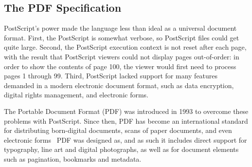 % 
% 

\subsection{The PDF Specification}

PostScript's power made the language less than ideal as a universal
document format. First, the PostScript is somewhat verbose, so
PostScript files could get quite large. Second, the PostScript
execution context is not reset after each page, with the result that
PostScript viewers could not display pages out-of-order: in order to
show the contents of page 100, the viewer would first need to process
pages 1 through 99. Third, PostScript lacked support for many features
demanded in a modern electronic document format, such as data
encryption, digital rights management, and electronic forms.

The Portable Document Format (PDF) was introduced in 1993 to overcome
these problems with PostScript. Since then, PDF has become an
international standard for distributing born-digital documents, scans
of paper documents, and even electronic forms~ 
PDF was designed as, and as
such it includes direct support for typography, line art and digital
photographs, as well as for document elements such as pagination,
bookmarks and metadata. 

